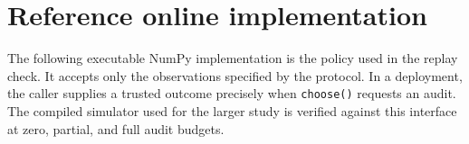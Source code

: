 \clearpage
\section{Reference online implementation}\label{app:code}
The following executable NumPy implementation is the policy used in the replay check. It accepts only the observations specified by the protocol. In a deployment, the caller supplies a trusted outcome precisely when \texttt{choose()} requests an audit. The compiled simulator used for the larger study is verified against this interface at zero, partial, and full audit budgets.


